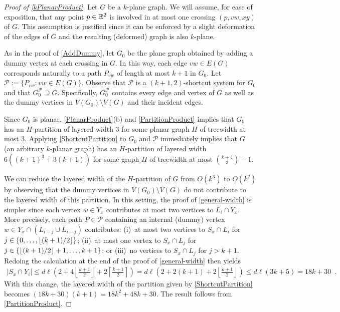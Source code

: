 \documentclass{patmorin}
\DeclarePairedDelimiter{\floor}{\lfloor}{\rfloor}
\newcommand{\PP}{\mathcal{P}}
\renewcommand{\le}{\leqslant}
\begin{document}
\begin{proof}[Proof of \cref{kPlanarProduct}]
	Let $G$ be a $k$-plane graph.  We will assume, for ease of exposition, that any point $p\in\mathbb{R}^2$ is involved in at most one crossing $(p,vw,xy)$ of $G$. This assumption is justified since it can be enforced by a slight deformation of the edges of $G$ and the resulting (deformed) graph is also $k$-plane.
	
	As in the proof of \cref{AddDummy}, let $G_0$ be the plane graph obtained by adding a dummy vertex at each crossing in $G$. In this way, each edge $vw\in E(G)$ corresponds naturally to a path $P_{vw}$ of length at most $k+1$ in $G_0$.  Let $\PP := \{P_{vw}: vw\in E(G)\}$. Observe that $\PP$ is a $(k+1,2)$-shortcut system for $G_0$ and that $G_0^{\PP}\supseteq G$.  Specifically, $G_0^{\PP}$ contains every edge and vertex of $G$ as well as the dummy vertices in $V(G_0)\setminus V(G)$ and their incident edges.
	
	Since $G_0$ is planar,  \cref{PlanarProduct}(b) and \cref{PartitionProduct} implies that $G_0$ has an $H$-partition of layered width 3 for some planar graph $H$ of treewidth at most 3.  Applying \cref{ShortcutPartition} to $G_0$ and $\mathcal{P}$ immediately implies that $G$ (an arbitrary $k$-planar graph) has an $H$-partition of layered width $6((k+1)^3+3(k+1))$ for some graph $H$ of treewidth at most $\binom{k+4}{3}-1$.
	
	We can reduce the layered width of the $H$-partition of $G$ from $O(k^3)$ to $O(k^2)$ by observing that the dummy vertices in $V(G_0)\setminus V(G)$ do not contribute to the layered width of this partition.  In this setting, the proof of \cref{general-width} is simpler since each vertex $w\in Y_x$ contributes at most two vertices to $L_i\cap Y_x$.  More precisely, each path $P\in\mathcal{P}$ containing an internal (dummy) vertex $w\in Y_x\cap (L_{i-j}\cup L_{i+j})$ contributes: (i)~at most two vertices to $S_x\cap L_i$ for $j\in\{0,\ldots,\floor{(k+1)/2}\}$; (ii)~at most one vertex to $S_x\cap L_j$ for $j\in\{\floor{(k+1)/2}+1,\ldots,k+1\}$; or (iii)~no vertices to $S_x\cap L_j$ for $j > k+1$.
	Redoing the calculation at the end of the proof of \cref{general-width} then yields
	\begin{align*}
	|S_x\cap Y_i| \le d\ell\left(
	2
	+ 4\left\lfloor\tfrac{k+1}{2}\right\rfloor
	+ 2\left\lceil\tfrac{k+1}{2}\right\rceil
	\right)
	 =
	d\ell\left(
	2 + 2(k+1) + 2\left\lfloor\tfrac{k+1}{2}\right\rfloor
	\right) 
	 \le
	d\ell(3k+5)
	= 18k+30 \enspace .
	\end{align*}
	With this change, the layered width of the partition given by \cref{ShortcutPartition} becomes $(18k+30)(k+1)=18k^2+48k+30$.  
	The result follows from \cref{PartitionProduct}.
\end{proof}
\end{document}
